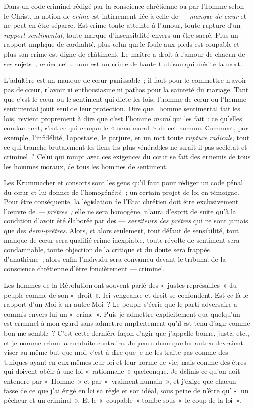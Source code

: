 \documentclass[french,twoside]{book} %
\begin{document}
Dans un code criminel rédigé par la conscience chrétienne ou par l’homme selon le Christ, la notion de \emph{crime} est intimement liée à celle de — \emph{manque de cœur} et ne peut en être séparée. Est crime toute atteinte à l’amour, toute rupture d’un \emph{rapport sentimental}, toute marque d’insensibilité envers un être sacré. Plus un rapport implique de cordialité, plus celui qui le foule aux pieds est coupable et plus son crime est digne de châtiment. Le maître a droit à l’amour de chacun de ses sujets ; renier cet amour est un crime de haute trahison qui mérite la mort.\par
L’adultère est un manque de cœur punissable ; il faut pour le commettre n’avoir pas de cœur, n’avoir ni enthousiasme ni pathos pour la sainteté du mariage. Tant que c’est le cœur ou le sentiment qui dicte les lois, l’homme de cœur ou l’homme sentimental jouit seul de leur protection. Dire que l’homme sentimental fait les lois, revient proprement à dire que c’est l’homme \emph{moral} qui les fait : ce qu’elles condamnent, c’est ce qui choque le « sens moral » de cet homme. Comment, par exemple, l’infidélité, l’apostasie, le parjure, en un mot toute \emph{rupture radicale}, tout ce qui tranche brutalement les liens les plus vénérables ne serait-il pas scélérat et  criminel ? Celui qui rompt avec ces exigences du cœur se fait des ennemis de tous les hommes moraux, de tous les hommes de sentiment.\par
Les Krummacher et consorts sont les gens qu’il faut pour rédiger un code pénal du cœur et lui donner de l’homogénéité ; un certain projet de loi en témoigne. Pour être conséquente, la législation de l’Etat chrétien doit être exclusivement l’œuvre de \emph{ — prêtres ;} elle ne sera homogène, n’aura d’esprit de suite qu’à la condition d’avoir été élaborée par des — \emph{serviteurs des prêtres} qui ne sont jamais que des \emph{demi-prêtres}. Alors, et alors seulement, tout défaut de sensibilité, tout manque de cœur sera qualifié crime inexpiable, toute révolte de sentiment sera condamnable, toute objection de la critique et du doute sera frappée d’anathème ; alors enfin l’individu sera convaincu devant le tribunal de la conscience chrétienne d’être foncièrement — criminel.\par
Les hommes de la Révolution ont souvent parlé des « justes représailles » du peuple comme de son « droit ». Ici vengeance et droit se confondent. Est-ce là le rapport d’un Moi à un autre Moi ? Le peuple s’écrie que le parti adversaire a commis envers lui un « crime ». Puis-je admettre explicitement que quelqu’un est criminel à mon égard sans admettre implicitement qu’il est tenu d’agir comme bon me semble ? C’est cette dernière façon d’agir que j’appelle bonne, juste, etc., et je nomme crime la conduite contraire. Je pense donc que les autres devraient viser au même but que moi, c’est-à-dire que je ne les traite pas comme des Uniques ayant en eux-mêmes leur loi et leur norme de vie, mais comme des êtres qui doivent obéir à une loi « rationnelle » quelconque. Je définis ce qu’on doit entendre par « Homme » et par « vraiment humain », et j’exige que chacun fasse de ce que j’ai érigé en loi sa règle et son idéal, sous peine de n’être qu’ « un pécheur et un criminel ». Et le « coupable » tombe sous « le coup de la loi ».\par
\end{document}
